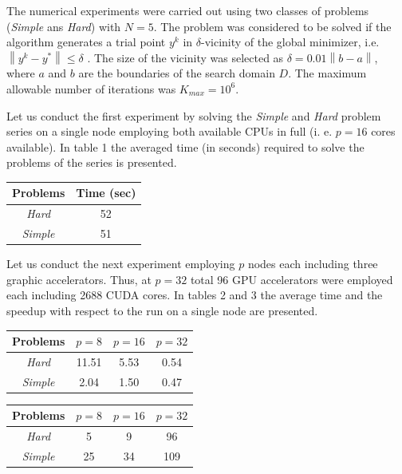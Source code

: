 \documentclass[a4paper]{jpconf}
\begin{document}
The numerical experiments were carried out using two classes of problems 
(\textit{Simple} ans \textit{Hard}) with $N=5$. The problem was considered to 
be solved if the algorithm generates a trial point $y^k$ in $\delta$-vicinity 
of the global minimizer, i.e. $\left\|y^k-y^\ast\right\|\leq\delta$ . The 
size of the vicinity was selected as $\delta=0.01\left\|b-a\right\|$, where 
$a$ and $b$ are the boundaries of the search domain $D$. The maximum 
allowable number of iterations was $K_{max} = 10^6$.

Let us conduct the first experiment by solving the \textit{Simple} and \textit{Hard} problem 
series on a single node employing both available CPUs in full (i. e. $p=16$ 
cores available). In table 1 the averaged time (in seconds) 
required to solve the problems of the series is presented.

\begin{table}[ht]
\begin{center}
\begin{tabular}{cc}
\hline
Problems & Time (sec) \\
\hline
\textit{Hard} & 52  \\
\textit{Simple} & 51 \\
\hline
\end{tabular}
\end{center}
\end{table}

Let us conduct the next experiment employing $p$ nodes each including three 
graphic accelerators. Thus, at $p=32$ total 96 GPU accelerators were employed 
each including 2688 CUDA cores. In tables 2 and 3 the average time and the speedup with respect to the run 
on a single node are presented.

\begin{table}[ht]
\begin{center}
\begin{tabular}{cccc}
\hline
Problems & $p = 8$ & $p=16$ & $p=32$ \\
\hline
\textit{Hard} & 11.51 & 5.53 & 0.54 \\
\textit{Simple} & 2.04 & 1.50 & 0.47\\
\hline
\end{tabular}
\end{center}
\end{table}

\begin{table}[ht]
\begin{center}
\begin{tabular}{cccc}
\hline
Problems & $p = 8$ & $p=16$ & $p=32$ \\
\hline
\textit{Hard} & 5 & 9 & 96\\
\textit{Simple} & 25 & 34& 109\\
\hline
\end{tabular}
\end{center}
\end{table}
\end{document}
